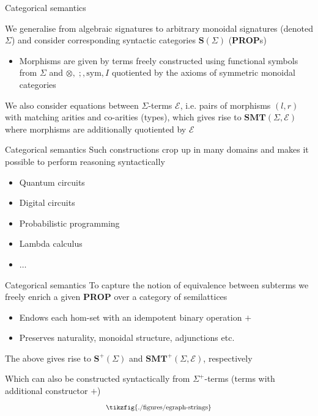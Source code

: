 \documentclass[aspectratio=169]{beamer}
\begin{document}
\begin{frame}{Categorical semantics}

We generalise from \alert{algebraic} signatures to arbitrary \alert{monoidal signatures} (denoted $\Sigma$) and consider corresponding syntactic categories $\mathbf{S}(\Sigma)$ (\textbf{PROP}s)
\begin{itemize}
    \item Morphisms are given by terms freely constructed using functional symbols from $\Sigma$ and $\otimes,\; ;, \text{sym}, I$ quotiented by the axioms of symmetric monoidal categories
\end{itemize}

We also consider equations between $\Sigma$-terms $\mathcal{E}$, i.e. pairs of morphisms $(l,r)$ with matching arities and co-arities (types), which gives rise to $\mathbf{SMT}(\Sigma,\mathcal{E})$ where morphisms are additionally quotiented by $\mathcal{E}$

\end{frame}

\begin{frame}{Categorical semantics}
Such constructions crop up in many domains and makes it possible to perform reasoning syntactically
\begin{itemize}
    \item Quantum circuits
    \item Digital circuits
    \item Probabilistic programming
    \item Lambda calculus
    \item $\ldots$
\end{itemize}
\end{frame}

\begin{frame}{Categorical semantics}
To capture the notion of equivalence between subterms we freely enrich a given \textbf{PROP} over a category of semilattices
\begin{itemize}
\item Endows each hom-set with an idempotent binary operation $+$
\item Preserves naturality, monoidal structure, adjunctions etc. 
\end{itemize}

The above gives rise to $\mathbf{S}^{+}(\Sigma)$ and $\mathbf{SMT}^{+}(\Sigma,\mathcal{E})$, respectively

Which can also be constructed syntactically from $\Sigma^{+}$-terms (terms with additional constructor $+$)
\[
\scalebox{0.8}{
\tikzfig{./figures/egraph-strings}
}
\]

\end{frame}
\end{document}
